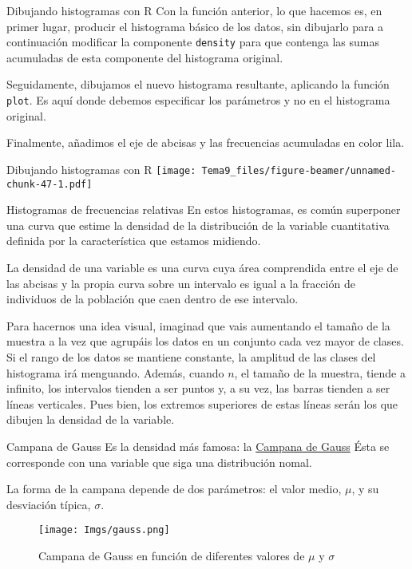 \documentclass[
  ignorenonframetext,
]{beamer}
\begin{document}
\begin{frame}[fragile]{Dibujando histogramas con R}
\protect\hypertarget{dibujando-histogramas-con-r-8}{}
Con la función anterior, lo que hacemos es, en primer lugar, producir el
histograma básico de los datos, sin dibujarlo para a continuación
modificar la componente \texttt{density} para que contenga las sumas
acumuladas de esta componente del histograma original.

Seguidamente, dibujamos el nuevo histograma resultante, aplicando la
función \texttt{plot}. Es aquí donde debemos especificar los parámetros
y no en el histograma original.

Finalmente, añadimos el eje de abcisas y las frecuencias acumuladas en
color lila.
\end{frame}

\begin{frame}{Dibujando histogramas con R}
\protect\hypertarget{dibujando-histogramas-con-r-9}{}
\texttt{[image: Tema9\_files/figure-beamer/unnamed-chunk-47-1.pdf]}
\end{frame}

\begin{frame}{Histogramas de frecuencias relativas}
\protect\hypertarget{histogramas-de-frecuencias-relativas}{}
En estos histogramas, es común superponer una curva que estime la
densidad de la distribución de la variable cuantitativa definida por la
característica que estamos midiendo.

La densidad de una variable es una curva cuya área comprendida entre el
eje de las abcisas y la propia curva sobre un intervalo es igual a la
fracción de individuos de la población que caen dentro de ese intervalo.

Para hacernos una idea visual, imaginad que vais aumentando el tamaño de
la muestra a la vez que agrupáis los datos en un conjunto cada vez mayor
de clases. Si el rango de los datos se mantiene constante, la amplitud
de las clases del histograma irá menguando. Además, cuando \(n\), el
tamaño de la muestra, tiende a infinito, los intervalos tienden a ser
puntos y, a su vez, las barras tienden a ser líneas verticales. Pues
bien, los extremos superiores de estas líneas serán los que dibujen la
densidad de la variable.
\end{frame}

\begin{frame}{Campana de Gauss}
\protect\hypertarget{campana-de-gauss}{}
Es la densidad más famosa: la
\href{https://es.wikipedia.org/wiki/Función_gaussiana}{Campana de Gauss}
Ésta se corresponde con una variable que siga una distribución nomal.

La forma de la campana depende de dos parámetros: el valor medio,
\(\mu\), y su desviación típica, \(\sigma\).

\begin{figure}
\centering
\texttt{[image: Imgs/gauss.png]}
\caption{Campana de Gauss en función de diferentes valores de \(\mu\) y
\(\sigma\)}
\end{figure}
\end{frame}
\end{document}
